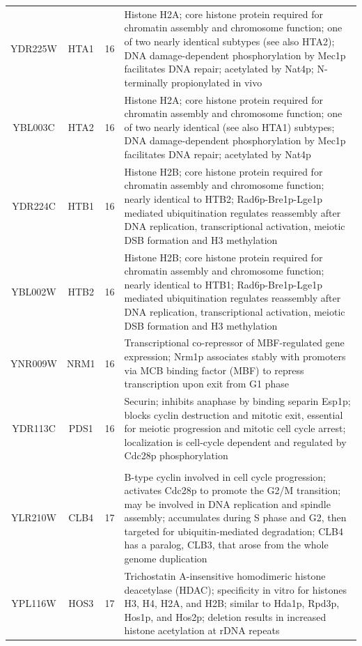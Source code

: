 \documentclass[]{article}
\begin{document}
\begin{longtable}{@{\extracolsep{3pt}} cccp{85mm}}
YDR225W & HTA1 & 16 & Histone H2A; core histone protein required for chromatin assembly and chromosome function; one of two nearly identical subtypes (see also HTA2); DNA damage-dependent phosphorylation by Mec1p facilitates DNA repair; acetylated by Nat4p; N-terminally propionylated in vivo \\ 
YBL003C & HTA2 & 16 & Histone H2A; core histone protein required for chromatin assembly and chromosome function; one of two nearly identical (see also HTA1) subtypes; DNA damage-dependent phosphorylation by Mec1p facilitates DNA repair; acetylated by Nat4p \\ 
YDR224C & HTB1 & 16 & Histone H2B; core histone protein required for chromatin assembly and chromosome function; nearly identical to HTB2; Rad6p-Bre1p-Lge1p mediated ubiquitination regulates reassembly after DNA replication, transcriptional activation, meiotic DSB formation and H3 methylation \\ 
YBL002W & HTB2 & 16 & Histone H2B; core histone protein required for chromatin assembly and chromosome function; nearly identical to HTB1; Rad6p-Bre1p-Lge1p mediated ubiquitination regulates reassembly after DNA replication, transcriptional activation, meiotic DSB formation and H3 methylation \\ 
YNR009W & NRM1 & 16 & Transcriptional co-repressor of MBF-regulated gene expression; Nrm1p associates stably with promoters via MCB binding factor (MBF) to repress transcription upon exit from G1 phase \\ 
YDR113C & PDS1 & 16 & Securin; inhibits anaphase by binding separin Esp1p; blocks cyclin destruction and mitotic exit, essential for meiotic progression and mitotic cell cycle arrest; localization is cell-cycle dependent and regulated by Cdc28p phosphorylation \\   \hline \\ [-1.8ex] 
YLR210W & CLB4 & 17 & B-type cyclin involved in cell cycle progression; activates Cdc28p to promote the G2/M transition; may be involved in DNA replication and spindle assembly; accumulates during S phase and G2, then targeted for ubiquitin-mediated degradation; CLB4 has a paralog, CLB3, that arose from the whole genome duplication \\ 
YPL116W & HOS3 & 17 & Trichostatin A-insensitive homodimeric histone deacetylase (HDAC); specificity in vitro for histones H3, H4, H2A, and H2B; similar to Hda1p, Rpd3p, Hos1p, and Hos2p; deletion results in increased histone acetylation at rDNA repeats \\ 

\end{longtable}
\end{document}

